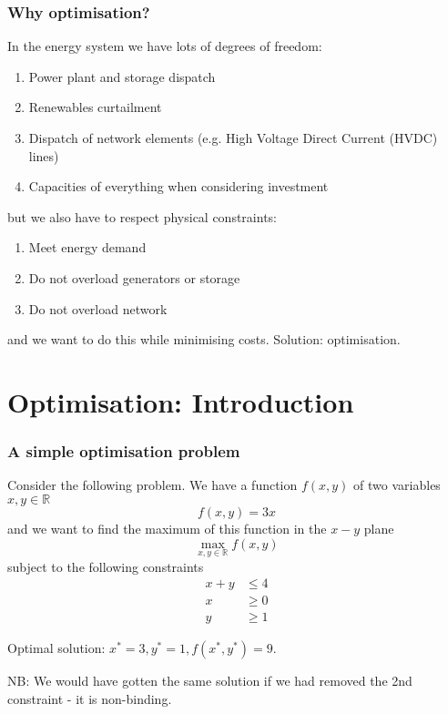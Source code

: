 \documentclass[10pt,aspectratio=169,dvipsnames]{beamer}
\let\olditem\item
\renewcommand{\item}{%
\olditem\vspace{5pt}}
\begin{document}
\begin{frame}
  \frametitle{Why optimisation?}

  In the energy system we have lots of \alert{degrees of freedom}:
  \begin{enumerate}
  \item Power plant and storage dispatch
  \item Renewables curtailment
  \item Dispatch of network elements (e.g. High Voltage Direct Current (HVDC) lines)
    \item Capacities of everything when considering investment
  \end{enumerate}
  but we also have to respect \alert{physical constraints}:
  \begin{enumerate}
    \item Meet energy demand
  \item Do not overload generators or storage
    \item Do not overload network
  \end{enumerate}
  and we want to do this while \alert{minimising costs}. Solution: \alert{optimisation}.

\end{frame}


\section{Optimisation: Introduction}


\begin{frame}
  \frametitle{A simple optimisation problem}

  Consider the following problem. We have a function $f(x,y)$ of two variables $x,y\in \mathbb{R}$
  \begin{equation*}
    f(x,y) = 3x
  \end{equation*}
  and we want to find the maximum of this function in the $x-y$ plane
  \begin{equation*}
    \max_{x,y\in \mathbb{R}} f(x,y)
  \end{equation*}
  subject to the following constraints
  \begin{align}
    x + y & \leq 4 \\
    x & \geq 0 \\
    y & \geq 1
  \end{align}

  \pause
  \alert{Optimal solution:} $x^* = 3, y^* = 1, f(x^*,y^*) = 9$.

  NB: We would have gotten the same solution if we had removed the 2nd constraint - it is \alert{non-binding}.
\end{frame}
\end{document}
